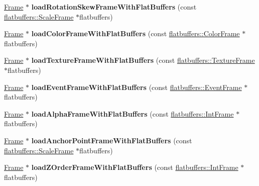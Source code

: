 \begin{DoxyCompactItemize}
\hyperlink{classFrame}{Frame} $\ast$ {\bfseries load\+Rotation\+Skew\+Frame\+With\+Flat\+Buffers} (const \hyperlink{structflatbuffers_1_1ScaleFrame}{flatbuffers\+::\+Scale\+Frame} $\ast$flatbuffers)
\item 
\mbox{\label{classActionTimelineCache_ac8e2375c496095474887ad8fffe09f8a}} 
\hyperlink{classFrame}{Frame} $\ast$ {\bfseries load\+Color\+Frame\+With\+Flat\+Buffers} (const \hyperlink{structflatbuffers_1_1ColorFrame}{flatbuffers\+::\+Color\+Frame} $\ast$flatbuffers)
\item 
\mbox{\label{classActionTimelineCache_a5cccc44995557cc2163e64058afc0a90}} 
\hyperlink{classFrame}{Frame} $\ast$ {\bfseries load\+Texture\+Frame\+With\+Flat\+Buffers} (const \hyperlink{structflatbuffers_1_1TextureFrame}{flatbuffers\+::\+Texture\+Frame} $\ast$flatbuffers)
\item 
\mbox{\label{classActionTimelineCache_a867eee634b2624327349cb08ef1f80ab}} 
\hyperlink{classFrame}{Frame} $\ast$ {\bfseries load\+Event\+Frame\+With\+Flat\+Buffers} (const \hyperlink{structflatbuffers_1_1EventFrame}{flatbuffers\+::\+Event\+Frame} $\ast$flatbuffers)
\item 
\mbox{\label{classActionTimelineCache_aa56a0dbcff80051cd4925a5f423b4613}} 
\hyperlink{classFrame}{Frame} $\ast$ {\bfseries load\+Alpha\+Frame\+With\+Flat\+Buffers} (const \hyperlink{structflatbuffers_1_1IntFrame}{flatbuffers\+::\+Int\+Frame} $\ast$flatbuffers)
\item 
\mbox{\label{classActionTimelineCache_affae78ef4131462ffc3bc294aba3fea7}} 
\hyperlink{classFrame}{Frame} $\ast$ {\bfseries load\+Anchor\+Point\+Frame\+With\+Flat\+Buffers} (const \hyperlink{structflatbuffers_1_1ScaleFrame}{flatbuffers\+::\+Scale\+Frame} $\ast$flatbuffers)
\item 
\mbox{\label{classActionTimelineCache_abd0f01dcd03f5202477c0fbf9031ca06}} 
\hyperlink{classFrame}{Frame} $\ast$ {\bfseries load\+Z\+Order\+Frame\+With\+Flat\+Buffers} (const \hyperlink{structflatbuffers_1_1IntFrame}{flatbuffers\+::\+Int\+Frame} $\ast$flatbuffers)
\item 
\mbox{\label{classActionTimelineCache_a0e7d3483df9ca285975a06fcf27b94dc}} 

\end{DoxyCompactItemize}
